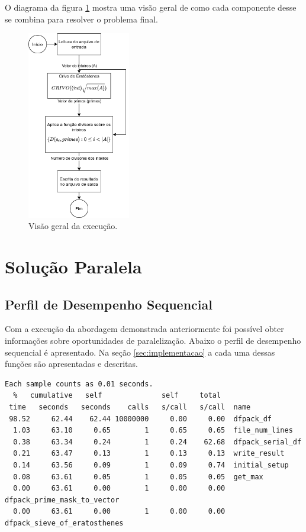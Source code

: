 \documentclass[12pt]{article}
\begin{document}
O diagrama da figura \ref{fig:execoverviewserial} mostra uma visão geral de como cada componente desse se combina para resolver o problema final.

\begin{figure}[H]
	\centering
	\includegraphics[width=4.5cm]{./overview_parallel_df.png}
	\caption{Visão geral da execução.}
	\label{fig:execoverviewserial}
\end{figure}

\section{Solução Paralela}
\label{sec:solucao_paralela_hibrida}

\subsection{Perfil de Desempenho Sequencial}

Com a execução da abordagem demonstrada anteriormente foi possível obter informações sobre oportunidades de paralelização. Abaixo o perfil de desempenho sequencial é apresentado. Na seção \ref{sec:implementacao} a cada uma dessas funções são apresentadas e descritas.


	{
		\scriptsize
		\begin{verbatim}
Each sample counts as 0.01 seconds.
  %   cumulative   self              self     total           
 time   seconds   seconds    calls   s/call   s/call  name    
 98.52     62.44    62.44 10000000     0.00     0.00  dfpack_df
  1.03     63.10     0.65        1     0.65     0.65  file_num_lines
  0.38     63.34     0.24        1     0.24    62.68  dfpack_serial_df
  0.21     63.47     0.13        1     0.13     0.13  write_result
  0.14     63.56     0.09        1     0.09     0.74  initial_setup
  0.08     63.61     0.05        1     0.05     0.05  get_max
  0.00     63.61     0.00        1     0.00     0.00  dfpack_prime_mask_to_vector
  0.00     63.61     0.00        1     0.00     0.00  dfpack_sieve_of_eratosthenes
\end{verbatim}
	}
\end{document}
